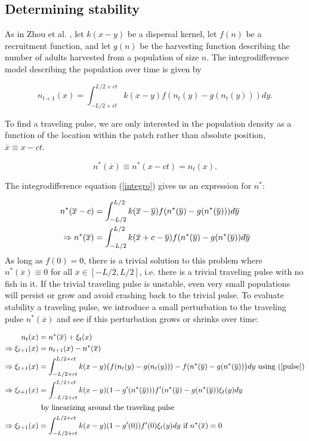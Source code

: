 \documentclass[12pt,english]{article}
\begin{document}
\subsection{Determining stability \label{stab}}
As in Zhou et al. \citep{ZhouKot2011}, let $k(x-y)$ be a dispersal kernel, let $f(n)$ be a recruitment function, and let $g(n)$ be the harvesting function describing the number of adults harvested from a population of size $n$.  The integrodifference model describing the population over time is given by 

\begin{equation} n_{t+1}(x)=\int_{-L/2+ct}^{L/2+ct}k(x-y)f(n_t(y)-g(n_t(y)))dy. \label{integro} \end{equation}

To find a traveling pulse, we are only interested in the population density as a function of the location within the patch rather than absolute position, $\overline{x}\equiv x-ct$.

\begin{equation*}
n^*(\overline{x})\equiv n^*(x-ct)=n_t(x).   \label{trav} 
\end{equation*}

The integrodifference equation (\ref{integro}) gives us an expression for $n^*$:

\begin{align}
n^*(\overline{x}-c)&=\int_{-L/2}^{L/2}k(\overline{x}-\overline{y})f(n^*(\overline{y})-g(n^*(\overline{y})))d\overline y \notag
\\ \Rightarrow n^*(\overline{x})&=\int_{-L/2}^{L/2}k(\overline{x}+c-\overline{y})f(n^*(\overline{y})-g(n^*(\overline{y}))d\overline y  \label{pulse}
\end{align}
As long as $f(0)=0$, there is a trivial solution to this problem where $n^*(\overline{x})\equiv 0$ for all $\overline{x}\in[-L/2,L/2]$, i.e. there is a trivial traveling pulse with no fish in it.  If the trivial traveling pulse is unstable, even very small populations will persist or grow and avoid crashing back to the trivial pulse.  To evaluate stability a traveling pulse, we introduce a small perturbation to the traveling pulse $n^*(\overline{x})$ and see if this perturbation grows or shrinks over time:

\begin{align}
n_t(x)&=n^*(\overline{x})+\xi_t(x) \notag
\\ \Rightarrow \xi_{t+1}(x)&=n_{t+1}(x)-n^*(\overline{x}) \notag
\\ \Rightarrow \xi_{t+1}(x)&=\int_{-L/2+ct}^{L/2+ct}k(x-y)\big(f(n_t(y)-g(n_t(y)))-f(n^*(\overline{y})-g(n^*(\overline{y}))\big)dy \text{ using (\ref{pulse})} \notag
\\ \Rightarrow \xi_{t+1}(x)&=\int_{-L/2+ct}^{L/2+ct}k(x-y)(1-g'(n^*(\overline{y})))f'(n^*(\overline{y})-g(n^*(\overline{y}))\xi_t(y)dy \notag
\\& \text{ by linearizing around the traveling pulse} \notag
\\ \Rightarrow \xi_{t+1}(x)&=\int_{-L/2+ct}^{L/2+ct}k(x-y)(1-g'(0))f'(0)\xi_t(y)dy \text{ if $n^*(\overline{x})=0$} \label{perturb}
\end{align}
\end{document}
